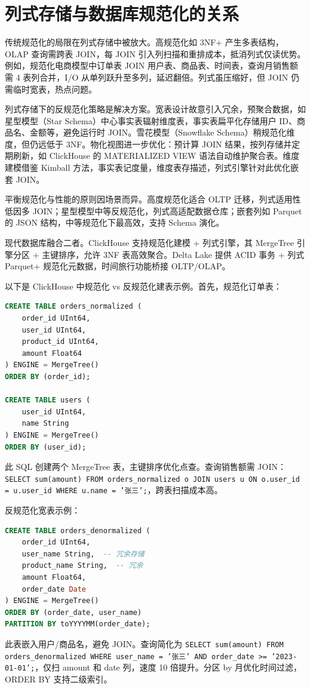 \chapter{列式存储与数据库规范化的关系}
传统规范化的局限在列式存储中被放大。高规范化如 3NF+ 产生多表结构，OLAP 查询需跨表 JOIN，每 JOIN 引入列扫描和重排成本，抵消列式仅读优势。例如，规范化电商模型中订单表 JOIN 用户表、商品表、时间表，查询月销售额需 4 表列合并，I/O 从单列跃升至多列，延迟翻倍。列式虽压缩好，但 JOIN 仍需临时宽表，热点问题。\par
列式存储下的反规范化策略是解决方案。宽表设计故意引入冗余，预聚合数据，如星型模型（Star Schema）中心事实表辐射维度表，事实表扁平化存储用户 ID、商品名、金额等，避免运行时 JOIN。雪花模型（Snowflake Schema）稍规范化维度，但仍远低于 3NF。物化视图进一步优化：预计算 JOIN 结果，按列存储并定期刷新，如 ClickHouse 的 MATERIALIZED VIEW 语法自动维护聚合表。维度建模借鉴 Kimball 方法，事实表记度量，维度表存描述，列式引擎针对此优化嵌套 JOIN。\par
平衡规范化与性能的原则因场景而异。高度规范化适合 OLTP 迁移，列式适用性低因多 JOIN；星型模型中等反规范化，列式高适配数据仓库；嵌套列如 Parquet 的 JSON 结构，中等规范化下最高效，支持 Schema 演化。\par
现代数据库融合二者。ClickHouse 支持规范化建模 + 列式引擎，其 MergeTree 引擎分区 + 主键排序，允许 3NF 表高效聚合。Delta Lake 提供 ACID 事务 + 列式 Parquet+ 规范化元数据，时间旅行功能桥接 OLTP/OLAP。\par
以下是 ClickHouse 中规范化 vs 反规范化建表示例。首先，规范化订单表：\par
\begin{lstlisting}[language=sql]
CREATE TABLE orders_normalized (
    order_id UInt64,
    user_id UInt64,
    product_id UInt64,
    amount Float64
) ENGINE = MergeTree()
ORDER BY (order_id);

CREATE TABLE users (
    user_id UInt64,
    name String
) ENGINE = MergeTree()
ORDER BY (user_id);
\end{lstlisting}
此 SQL 创建两个 MergeTree 表，主键排序优化点查。查询销售额需 JOIN：\texttt{SELECT sum(amount) FROM orders\_{}normalized o JOIN users u ON o.user\_{}id = u.user\_{}id WHERE u.name = '张三';}，跨表扫描成本高。\par
反规范化宽表示例：\par
\begin{lstlisting}[language=sql]
CREATE TABLE orders_denormalized (
    order_id UInt64,
    user_name String,  -- 冗余存储
    product_name String,  -- 冗余
    amount Float64,
    order_date Date
) ENGINE = MergeTree()
ORDER BY (order_date, user_name)
PARTITION BY toYYYYMM(order_date);
\end{lstlisting}
此表嵌入用户/商品名，避免 JOIN。查询简化为 \texttt{SELECT sum(amount) FROM orders\_{}denormalized WHERE user\_{}name = '张三' AND order\_{}date >= '2023-01-01';}，仅扫 amount 和 date 列，速度 10 倍提升。分区 by 月优化时间过滤，ORDER BY 支持二级索引。\par
